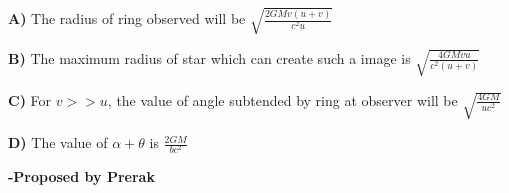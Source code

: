 \documentclass[11pt,a4paper]{scrartcl}
\begin{document}
\begin{problem}
\vspace{5mm}

\textbf{A)} The radius of ring observed will be $\sqrt{\frac{2GMv(u+v)}{c^2u}}$

\vspace{2mm}


\textbf{B)} The maximum radius of star which can create such a image is $\sqrt{\frac{4GMvu}{c^2(u+v)}}$

\vspace{2mm}

\textbf{C)} For $v>>u$, the value of angle subtended by ring at observer will be $\sqrt{\frac{4GM}{uc^2}}$

\vspace{2mm}

\textbf{D)} The value of $\alpha+\theta$ is $\frac{2GM}{bc^2}$
\end{problem}
\begin{flushright}
\textbf{\Large{-Proposed by Prerak}}
\end{flushright}
\end{document}
